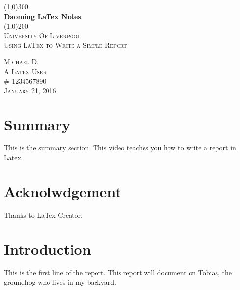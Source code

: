 \documentclass{article}
\begin{document}
\begin{titlepage}
	\begin{center} 
	\line(1,0){300}\\
	[0.25in]
	\huge {\bfseries Daoming LaTex Notes}\\
	[2mm]
	\line(1,0){200}\\
	[1.5cm]
	\textsc{\LARGE University Of Liverpool}\\
	[0.75cm]
	\textsc{\LARGE Using LaTex to Write a Simple Report}\\
	[8cm]
	\end{center}
	\begin{flushright}
	\textsc{\large Michael D. \\
	A Latex User \\
	\# 1234567890 \\
	January 21, 2016 \\}
	\end{flushright}
\end{titlepage}

\section*{Summary}
This is the summary section. This video teaches you how to write a report in Latex
\cleardoublepage

\section*{Acknolwdgement}
Thanks to LaTex Creator.
\cleardoublepage

\tableofcontents
\thispagestyle{empty}
\cleardoublepage

\listoffigures
{}
\cleardoublepage

\listoftables
{}
\cleardoublepage

\setcounter{page}{1}





\section{Introduction}\label{sec:intro}
This is the first line of the report. This report will document on Tobias, the groundhog who lives in my backyard.
\end{document}
